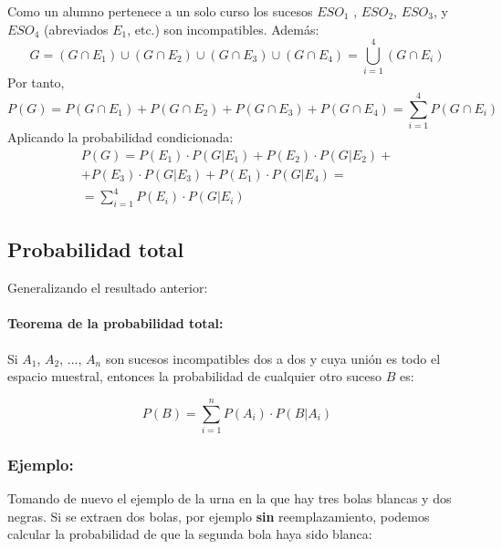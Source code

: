 \documentclass[a4paper,spanish,9pt]{extarticle}
\begin{document}
\begin{multicols*}{2}

Como un alumno pertenece a un solo curso los sucesos $ESO_1$ , $ESO_2$, $ESO_3$, y $ESO_4$ (abreviados $E_1$, etc.) son incompatibles. Además: $$G=(G \cap E_1)\cup(G \cap E_2)\cup(G \cap E_3)\cup(G \cap E_4)=\bigcup_{i=1}^4(G \cap E_i)$$
Por tanto,
$$P(G)=P(G \cap E_1)+P(G \cap E_2)+P(G \cap E_3)+P(G \cap E_4)=\sum_{i=1}^4 P(G \cap E_i)$$
Aplicando la probabilidad condicionada:
\begin{eqnarray*}
P(G)=P(E_1)\cdot P(G|E_1)+P(E_2)\cdot P(G|E_2)+\\+P(E_3)\cdot P(G|E_3)+P(E_1)\cdot P(G|E_4)= \\ =\sum_{i=1}^4 P(E_i)\cdot  P(G|E_i)
\end{eqnarray*}

\subsection{Probabilidad total}
Generalizando el resultado anterior:

\paragraph{Teorema de la probabilidad total:} Si $A_1$, $A_2$, ..., $A_n$   son sucesos incompatibles dos a dos y cuya unión es todo el espacio muestral, entonces la probabilidad de cualquier otro suceso $B$ es:

$$P(B)=\sum_{i=1}^n P(A_i)\cdot  P(B|A_i) $$

\subsubsection{Ejemplo:} Tomando de nuevo el ejemplo de la urna en la que hay tres bolas blancas y dos negras. Si se extraen dos bolas, por ejemplo \textbf{sin} reemplazamiento, podemos calcular la probabilidad de que la segunda bola haya sido blanca: 


\end{multicols*}
\end{document}
